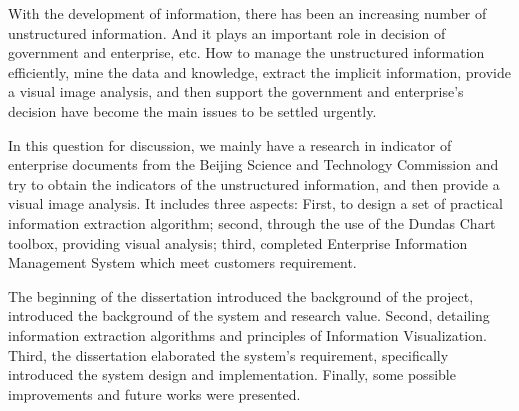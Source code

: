 

\begin{abstract-en}
With the development of information, there has been an increasing number of unstructured information. And it plays an important role in decision of government and enterprise, etc. How to manage the unstructured information efficiently, mine the data and knowledge, extract the implicit information, provide a visual image analysis, and then support the government and enterprise's decision have become the main issues to be settled urgently. 	

In this question for discussion, we mainly have a research in indicator of enterprise documents from the Beijing Science and Technology Commission and try to obtain the indicators of the unstructured information, and then provide a visual image analysis. It includes three aspects: First, to design a set of practical information extraction algorithm; second, through the use of the Dundas Chart toolbox, providing visual analysis; third, completed Enterprise Information Management System which meet customers requirement.

The beginning of the dissertation introduced the background of the project, introduced the background of the system and research value. Second, detailing information extraction algorithms and principles of Information Visualization. Third, the dissertation elaborated the system's requirement, specifically introduced the system design and implementation. Finally, some possible improvements and future works were presented.  
\end{abstract-en}